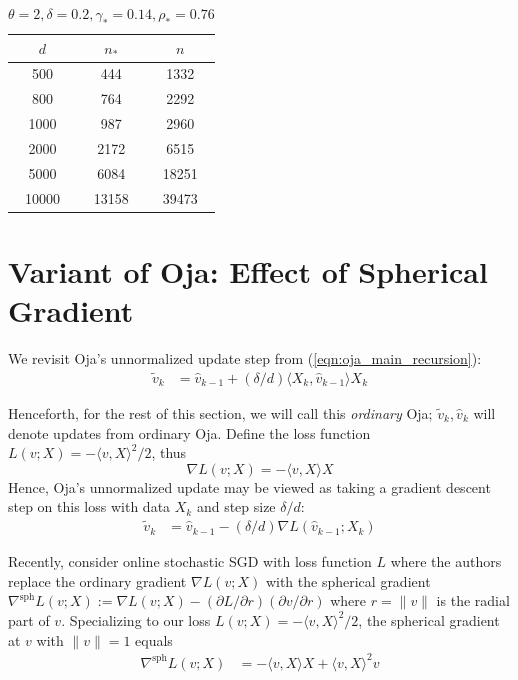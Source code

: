\documentclass[12pt]{article}
\newcommand{\sph}{\text{sph}}
\begin{document}
\begin{table}[p]
    \centering
    \begin{tabular}{|c|c|c|}
        \hline
        $d$ & $n_*$ & $n$ \\
        \hline
        500 & 444 & 1332\\
        800 & 764 & 2292\\
        1000 & 987 & 2960 \\
        2000 & 2172 & 6515 \\
        5000 & 6084 & 18251 \\
        10000 & 13158 & 39473\\
        \hline
    \end{tabular}
    \caption{$\theta=2,\delta=0.2,\gamma_*=0.14,\rho_*=0.76$}
\end{table}


\section{Variant of Oja: Effect of Spherical Gradient}\label{sec:BAGJ}

We revisit Oja's unnormalized update step from (\ref{eqn:oja_main_recursion}):
\begin{align*}
    \tilde v_k &= \hat v_{k-1} + (\delta/d) \langle X_k, \hat v_{k-1}\rangle X_k
\end{align*}

\medskip

Henceforth, for the rest of this section, we will call this \textit{ordinary} Oja; $\tilde v_k,\hat v_k$ will denote updates from ordinary Oja. Define the loss function $L(v;X)=-\langle v,X\rangle^2/2$, thus $$\nabla L(v;X)=-\langle v,X\rangle X$$ Hence, Oja's unnormalized update may be viewed as taking a gradient descent step on this loss with data $X_k$ and step size $\delta/d$:
\begin{align*}
    \tilde v_k &= \hat v_{k-1} - (\delta/d) \nabla L(\hat v_{k-1};X_k)
\end{align*}

\medskip

Recently, \citet{arous2021online} consider online stochastic SGD with loss function $L$ where the authors replace the ordinary gradient $\nabla L(v;X)$ with the spherical gradient $\nabla^\sph L(v;X):=\nabla L(v;X)-(\partial L/\partial r)(\partial v/\partial r)$ where $r=\|v\|$ is the radial part of $v$. Specializing to our loss $L(v;X)=-\langle v,X\rangle^2/2$, the spherical gradient at $v$ with $\|v\|=1$ equals
\begin{align*}
    \nabla^\sph L(v;X) &= -\langle v, X\rangle X + \langle v,X\rangle^2v
\end{align*}
\end{document}
